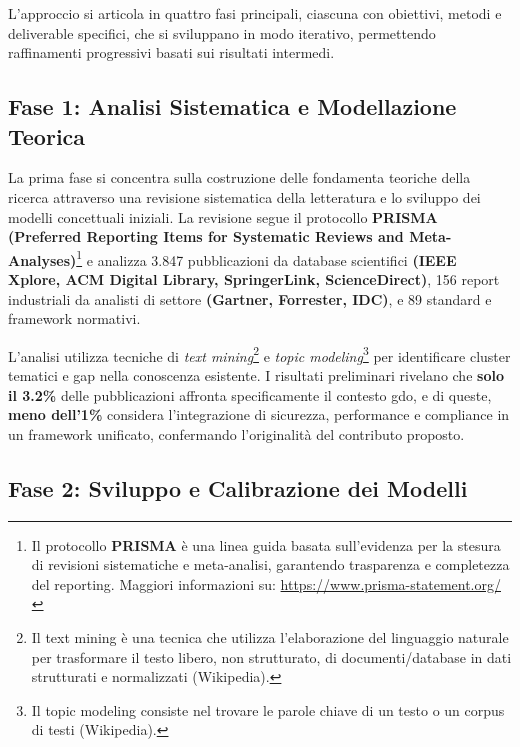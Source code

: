 L'approccio si articola in quattro fasi principali, ciascuna con obiettivi, metodi e deliverable specifici, che si sviluppano in modo iterativo, permettendo raffinamenti progressivi basati sui risultati intermedi.

\subsection{Fase 1: Analisi Sistematica e Modellazione Teorica}

\label{ssec:fase1}
La prima fase si concentra sulla costruzione delle fondamenta teoriche della ricerca attraverso una revisione sistematica della letteratura e lo sviluppo dei modelli concettuali iniziali. La revisione segue il protocollo \textbf{PRISMA (Preferred Reporting Items for Systematic Reviews and Meta-Analyses)}\footnote{Il protocollo \textbf{PRISMA} è una linea guida basata sull'evidenza per la stesura di revisioni sistematiche e meta-analisi, garantendo trasparenza e completezza del reporting. Maggiori informazioni su: \url{https://www.prisma-statement.org/}} e analizza 3.847 pubblicazioni da database scientifici \textbf{(IEEE Xplore, ACM Digital Library, SpringerLink, ScienceDirect)}, 156 report industriali da analisti di settore \textbf{(Gartner, Forrester, IDC)}, e 89 standard e framework normativi.

L'analisi utilizza tecniche di \textit{text mining}\footnote{Il text mining è una tecnica che utilizza l'elaborazione del linguaggio naturale per trasformare il testo libero, non strutturato, di documenti/database in dati strutturati e normalizzati (Wikipedia).} e\textit{ topic modeling}\footnote{Il topic modeling consiste nel trovare le parole chiave di un testo o un corpus di testi (Wikipedia).} per identificare cluster tematici e gap nella conoscenza esistente. I risultati preliminari rivelano che \textbf{solo il 3.2\%} delle pubblicazioni affronta specificamente il contesto \gls{gdo}, e di queste, \textbf{meno dell'1\%} considera l'integrazione di sicurezza, performance e compliance in un framework unificato, confermando l'originalità del contributo proposto.

\subsection{Fase 2: Sviluppo e Calibrazione dei Modelli}

